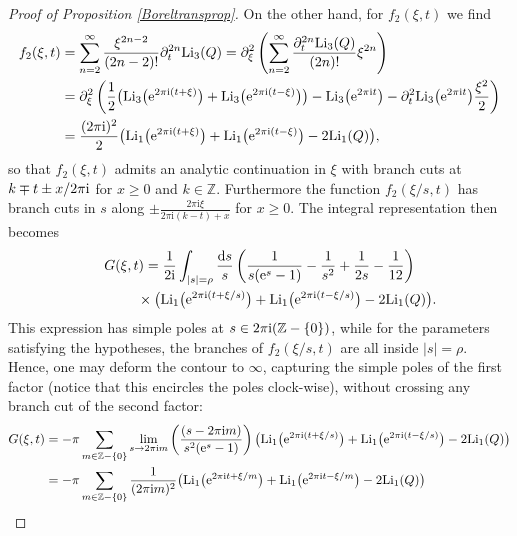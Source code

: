 \documentclass[pdftex]{sigma}
\numberwithin{equation}{section}
\begin{document}
\begin{proof}[Proof of Proposition \ref{Boreltransprop}]
On the other hand, for $f_2(\xi,t)$ we find
\begin{align*}
 f_2(\xi,t) &= \sum_{n=2}^{\infty} \frac{\xi^{2n-2}}{(2n-2)!} \partial_t^{2n} {\rm Li}_3(Q)
 = \partial_{\xi}^2 \left(\sum_{n=2}^{\infty} \frac{\partial_t^{2n} {\rm Li}_3(Q)}{(2n)!} \xi^{2n}\right) \\
 &= \partial_{\xi}^2 \left( \frac{1}{2} \big({\rm Li}_3\big({\rm e}^{2\pi \mathrm{i}(t+\xi)}\big)+{\rm Li}_3\big({\rm e}^{2\pi \mathrm{i}(t-\xi)}\big)\big) - {\rm Li}_3\big({\rm e}^{2\pi \mathrm{i} t}\big)-\partial_t^2 {\rm Li}_3\big({\rm e}^{2\pi \mathrm{i} t}\big) \frac{\xi^2}{2} \right) \\
 &=\frac{(2\pi \mathrm{i})^2}{2}\big(\mathrm{Li}_1\big({\rm e}^{2\pi \mathrm{i}(t + \xi)}\big)+\mathrm{Li}_1\big({\rm e}^{2\pi \mathrm{i}(t - \xi)}\big)-2\mathrm{Li}_1 (Q)\big),
\end{align*}
so that $f_2(\xi,t)$ admits an analytic continuation in $\xi$ with branch cuts at $k \mp t\pm x/2\pi {\rm i}$ for $x\geq 0$ and $k\in \mathbb{Z}$. Furthermore the function $f_2(\xi/s,t)$ has branch cuts in $s$ along $\pm \frac{2\pi \mathrm{i} \xi}{2\pi \mathrm{i}(k-t)+x}$ for $x\geq 0$. The integral representation then becomes
\begin{gather*}
 G(\xi,t)=\frac{1}{2\mathrm{i}}\int_{|s|=\rho} \frac{{\rm d}s}{s}\left(\frac{1}{ s({\rm e}^{s}-1)}-\frac{1}{s^2}+\frac{1}{2s}-\frac{1}{12}\right)\\
\hphantom{G(\xi,t)=}{}\times \big(\mathrm{Li}_1\big({\rm e}^{2\pi \mathrm{i}(t + \xi/s)}\big)+\mathrm{Li}_1\big({\rm e}^{2\pi \mathrm{i}(t - \xi/s)}\big) -2\mathrm{Li}_1(Q) \big).
\end{gather*}
This expression has simple poles at $s\in 2\pi {\rm i} (\mathbb{Z}-\{0\})$, while for the parameters satisfying the hypotheses, the branches of $f_2(\xi/s,t)$ are all inside $|s|=\rho$. Hence, one may deform the contour to $\infty$, capturing the simple poles of the first factor (notice that this encircles the poles clock-wise), without crossing any branch cut of the second factor:
\begin{align*}
 G(\xi,t)&=-\pi \sum_{m\in \mathbb{Z}-\{0\}} \lim_{s\rightarrow 2\pi \mathrm{i} m} \left(\frac{(s-2\pi \mathrm{i} m)}{ s^2({\rm e}^{s}-1)}\right)\big(\mathrm{Li}_1\big({\rm e}^{2\pi \mathrm{i}(t + \xi/s)}\big)+\mathrm{Li}_1\big({\rm e}^{2\pi \mathrm{i}(t - \xi/s)}\big)-2\mathrm{Li}_1(Q)\big) \\
 &=-\pi \sum_{m\in \mathbb{Z}-\{0\}} \frac{1}{(2\pi {\rm i} m)^2}\big(\mathrm{Li}_1\big({\rm e}^{2\pi \mathrm{i} t + \xi/m}\big)+\mathrm{Li}_1\big({\rm e}^{2\pi \mathrm{i} t - \xi/m}\big)-2\mathrm{Li}_1(Q)\big)\\

\end{align*}
\end{proof}
\end{document}
